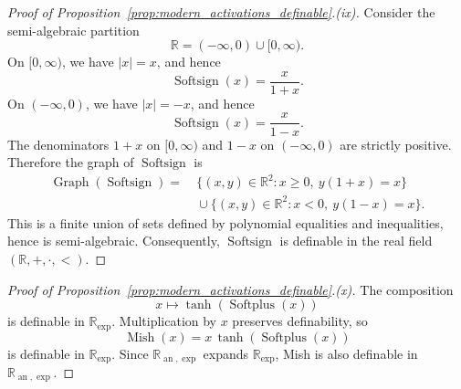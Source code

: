 \documentclass{article}
\newcommand{\eqdef}{\ensuremath{\stackrel{\mbox{\upshape\tiny def.}}{=}}}
\theoremstyle{plain}
\newtheorem{proposition}[theorem]{Proposition}
\theoremstyle{definition}
\theoremstyle{remark}
\theoremstyle{plain}
\numberwithin{thm}{section}
\theoremstyle{definition}
\numberwithin{equation}{section}
\begin{document}
\begin{proof}[{Proof of Proposition~\ref{prop:modern_activations_definable}.(ix)}]
Consider the semi-algebraic partition
\[
    \mathbb{R}=(-\infty,0)\cup[0,\infty).
\]
On \([0,\infty)\), we have \(|x|=x\), and hence
\[
    \operatorname{Softsign}(x)
    =
    \frac{x}{1+x}.
\]
On \((-\infty,0)\), we have \(|x|=-x\), and hence
\[
    \operatorname{Softsign}(x)
    =
    \frac{x}{1-x}.
\]
The denominators \(1+x\) on \([0,\infty)\) and \(1-x\) on \((-\infty,0)\)
are strictly positive. Therefore the graph of \(\operatorname{Softsign}\) is
\[
\begin{aligned}
    \operatorname{Graph}(\operatorname{Softsign})
    =
    &\ \{(x,y)\in\mathbb{R}^2:x\ge 0,\ y(1+x)=x\} \\
    &\ \cup
    \{(x,y)\in\mathbb{R}^2:x<0,\ y(1-x)=x\}.
\end{aligned}
\]
This is a finite union of sets defined by polynomial equalities and
inequalities, hence is semi-algebraic. Consequently, \(\operatorname{Softsign}\)
is definable in the real field \((\mathbb{R},+,\cdot,<)\).
\end{proof}

\begin{proof}[{Proof of Proposition~\ref{prop:modern_activations_definable}.(x)}] The
composition
\[
    x\mapsto \tanh(\operatorname{Softplus}(x))
\]
is definable in \(\mathbb{R}_{\exp}\). Multiplication by \(x\) preserves
definability, so
\[
    \operatorname{Mish}(x)
    =
    x\,\tanh(\operatorname{Softplus}(x))
\]
is definable in \(\mathbb{R}_{\exp}\). Since
\(\mathbb{R}_{\operatorname{an},\exp}\) expands \(\mathbb{R}_{\exp}\), Mish is
also definable in \(\mathbb{R}_{\operatorname{an},\exp}\).
\end{proof}


\end{document}
